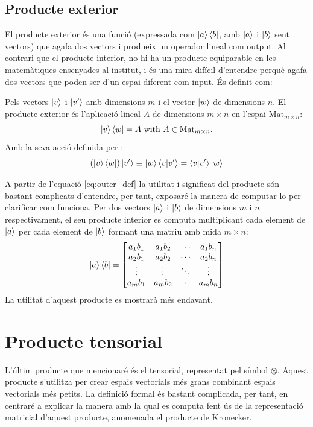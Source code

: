 \subsection{Producte exterior}
El producte exterior és una funció (expressada com $\ket{a}\bra{b}$, amb $\ket{a}$ i $\ket{b}$ sent vectors) que agafa dos vectors i produeix un operador lineal com output. Al contrari que el producte interior, no hi ha un producte equiparable en les matemàtiques ensenyades al institut, i és una mira difícil d'entendre perquè agafa dos vectors que poden ser d'un espai diferent com input. És definit com:

Pels vectors $\ket{v}$ i $\ket{v'}$ amb dimensions $m$ i el vector $\ket{w}$ de dimensions $n$. El producte exterior és l'aplicació lineal $A$ de dimensions $m \times n$ en l'espai $\mathrm{Mat}_{m\times n}$:
$$
\ket{v}\bra{w} = A \text{ with } A\in \mathrm{Mat}_{m\times n} .
$$ 
Amb la seva acció definida per \cite{QCandQI:inner}: 
\begin{equation}
	(\ket{v}\bra{w})\ket{v'} \equiv \ket{w}\bra{v}\ket{v'} = \bra{v}\ket{v'}\ket{w}
	\label{eq:outer_def}
\end{equation}

A partir de l'equació \eqref{eq:outer_def} la utilitat i significat del producte són bastant complicats d'entendre, per tant, exposaré la manera de computar-lo per clarificar com funciona. Per dos vectors $\ket{a}$ i $\ket{b}$ de dimensions $m$ i $n$ respectivament, el seu producte interior es computa multiplicant cada element de $\ket{a}$ per cada element de $\ket{b}$ formant una matriu amb mida $m\times n$:
$$
\ket{a}\bra{b} = \begin{bmatrix}
	a_1 b_1 & a_1 b_2 & \cdots & a_1 b_n \\
	a_2 b_1 & a_2 b_2 & \cdots & a_2 b_n \\
	\vdots  & \vdots  & \ddots& \vdots  \\
	a_m b_1 & a_m b_2 & \cdots & a_m b_n \\
\end{bmatrix}
$$
La utilitat d'aquest producte es mostrarà més endavant.

\section{Producte tensorial}
L'últim producte que mencionaré és el tensorial, representat pel símbol $\otimes$. Aquest producte s'utilitza per crear espais vectorials més grans combinant espais vectorials més petits. La definició formal és bastant complicada, per tant, en centraré a explicar la manera amb la qual es computa fent ús de la representació matricial d'aquest producte, anomenada el producte de Kronecker.

